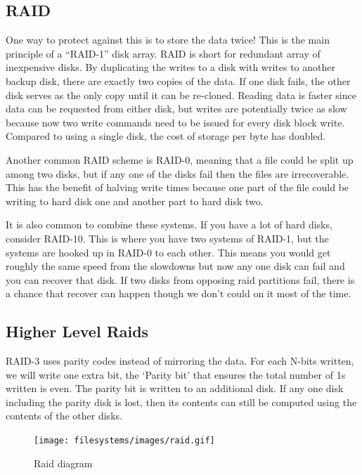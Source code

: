 \subsection{RAID}

One way to protect against this is to store the data twice! This is the main principle of a ``RAID-1'' disk array.
RAID is short for redundant array of inexpensive disks.
By duplicating the writes to a disk with writes to another backup disk, there are exactly two copies of the data.
If one disk fails, the other disk serves as the only copy until it can be re-cloned.
Reading data is faster since data can be requested from either disk, but writes are potentially twice as slow because now two write commands need to be issued for every disk block write.
Compared to using a single disk, the cost of storage per byte has doubled.

Another common RAID scheme is RAID-0, meaning that a file could be split up among two disks, but if any one of the disks fail then the files are irrecoverable.
This has the benefit of halving write times because one part of the file could be writing to hard disk one and another part to hard disk two.


It is also common to combine these systems.
If you have a lot of hard disks, consider RAID-10.
This is where you have two systems of RAID-1, but the systems are hooked up in RAID-0 to each other.
This means you would get roughly the same speed from the slowdowns but now any one disk can fail and you can recover that disk.
If two disks from opposing raid partitions fail, there is a chance that recover can happen though we don't could on it most of the time.

\subsection{Higher Level Raids}

RAID-3 uses parity codes instead of mirroring the data.
For each N-bits written, we will write one extra bit, the `Parity bit' that ensures the total number of 1s written is even.
The parity bit is written to an additional disk.
If any one disk including the parity disk is lost, then its contents can still be computed using the contents of the other disks.

\begin{figure}[htbp]
\centering
\texttt{[image: filesystems/images/raid.gif]}
\caption{Raid diagram}
\end{figure}

